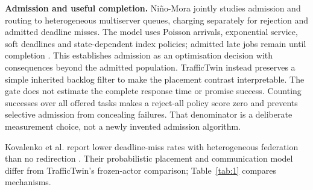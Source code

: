 \documentclass[12pt,a4paper]{article}
\begin{document}
\textbf{Admission and useful completion.} Niño-Mora jointly studies admission and routing to heterogeneous multiserver queues, charging separately for rejection and admitted deadline misses. The model uses Poisson arrivals, exponential service, soft deadlines and state-dependent index policies; admitted late jobs remain until completion \cite{ref20}. This establishes admission as an optimisation decision with consequences beyond the admitted population. TrafficTwin instead preserves a simple inherited backlog filter to make the placement contrast interpretable. The gate does not estimate the complete response time or promise success. Counting successes over all offered tasks makes a reject-all policy score zero and prevents selective admission from concealing failures. That denominator is a deliberate measurement choice, not a newly invented admission algorithm.

Kovalenko et al. report lower deadline-miss rates with heterogeneous federation than no redirection \cite{ref46}. Their probabilistic placement and communication model differ from TrafficTwin's frozen-actor comparison; Table~\ref{tab:1} compares mechanisms.
\end{document}
